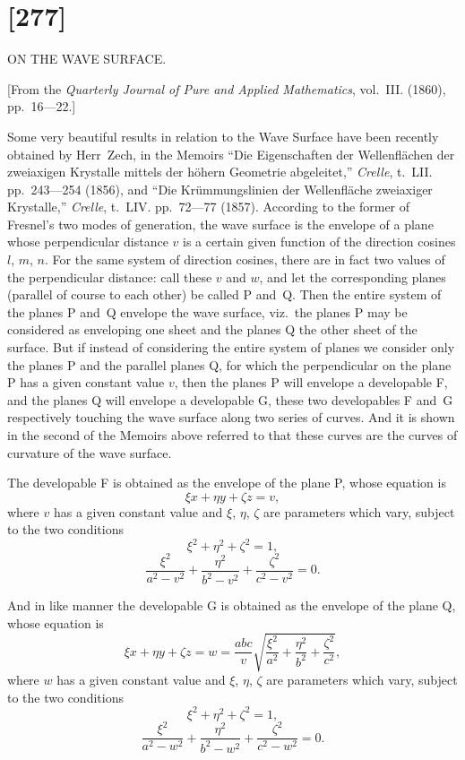 \documentclass[11pt,a4paper]{book}
\begin{document}
\newpage
\section*{[277]}
\begin{center}
{\large ON THE WAVE SURFACE.}
\end{center}

[From the \textit{Quarterly Journal of Pure and Applied Mathematics}, vol.~III. (1860),
pp.~16---22.]

Some very beautiful results in relation to the Wave Surface have been recently
obtained by Herr~Zech, in the Memoirs ``Die Eigenschaften der Wellenfl\"achen der
zweiaxigen Krystalle mittels der h\"ohern Geometrie abgeleitet,'' \textit{Crelle}, t.~LII.
pp.~243---254 (1856), and ``Die Kr\"ummungslinien der Wellenfl\"ache zweiaxiger
Krystalle,'' \textit{Crelle}, t.~LIV. pp.~72---77 (1857). According to the former of Fresnel's
two modes of generation, the wave surface is the envelope of a plane whose
perpendicular distance $v$ is a certain given function of the direction cosines
$l$, $m$, $n$. For the same system of direction cosines, there are in fact two
values of the perpendicular distance: call these $v$ and $w$, and let the
corresponding planes (parallel of course to each other) be called P and~Q.
Then the entire system of the planes P and~Q envelope the wave surface, viz.\ the
planes P may be considered as enveloping one sheet and the planes Q the other
sheet of the surface. But if instead of considering the entire system of planes we
consider only the planes P and the parallel planes Q, for which the perpendicular on
the plane P has a given constant value $v$, then the planes P will envelope a
developable F, and the planes Q will envelope a developable G, these two
developables F and~G respectively touching the wave surface along two series of
curves. And it is shown in the second of the Memoirs above referred to that these
curves are the curves of curvature of the wave surface.

The developable F is obtained as the envelope of the plane P, whose equation is
\[
\xi x + \eta y + \zeta z = v,
\]
where $v$ has a given constant value and $\xi$, $\eta$, $\zeta$ are parameters which vary,
subject to the two conditions
\[
\xi^{2} + \eta^{2} + \zeta^{2} = 1,
\]
\[
\frac{\xi^{2}}{a^{2} - v^{2}} + \frac{\eta^{2}}{b^{2} - v^{2}} + \frac{\zeta^{2}}{c^{2} - v^{2}} = 0.
\]

And in like manner the developable G is obtained as the envelope of the plane Q,
whose equation is
\[
\xi x + \eta y + \zeta z = w
= \frac{abc}{v}\sqrt{\frac{\xi^{2}}{a^{2}} + \frac{\eta^{2}}{b^{2}} + \frac{\zeta^{2}}{c^{2}}},
\]
where $w$ has a given constant value and $\xi$, $\eta$, $\zeta$ are parameters which vary,
subject to the two conditions
\[
\xi^{2} + \eta^{2} + \zeta^{2} = 1,
\]
\[
\frac{\xi^{2}}{a^{2} - w^{2}} + \frac{\eta^{2}}{b^{2} - w^{2}} + \frac{\zeta^{2}}{c^{2} - w^{2}} = 0.
\]
\end{document}
